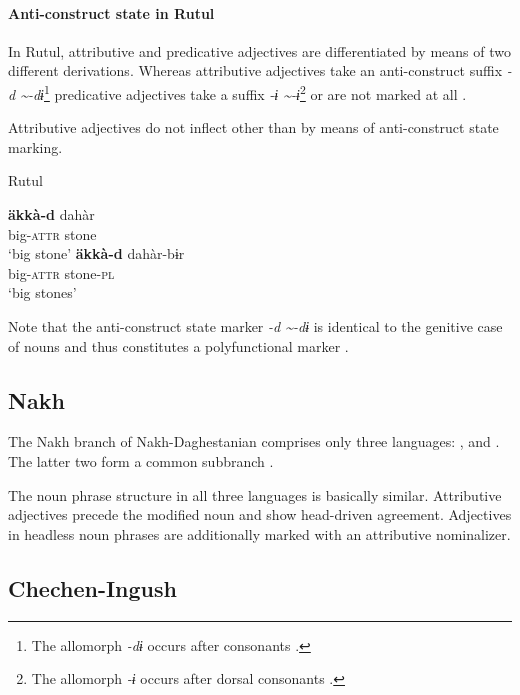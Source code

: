 \paragraph{Anti-construct state in Rutul}
In Rutul, attributive and predicative adjectives are differentiated by means of two different derivations. Whereas attributive adjectives take an anti-construct suffix \textit{-d \textasciitilde-dɨ}\footnote{The allomorph \textit{-dɨ} occurs after consonants \citep[224]{alekseev1994a}.} predicative adjectives take a suffix \textit{-ɨ \textasciitilde-ɨ}\footnote{The allomorph \textit{-ɨ} occurs after dorsal consonants \citep[224]{alekseev1994a}.} or are not marked at all \citep[224]{alekseev1994a}.

Attributive adjectives do not inflect other than by means of anti-construct state marking.
\begin{exe}
\ex \rm{Rutul \citep[237]{alekseev1994a}}
\begin{xlist}
\ex
\gll	\textbf{äkkà-d} dahàr\\
	big-\textsc{attr} stone\\
\glt	‘big stone’
\ex
\gll	\textbf{äkkà-d} dahàr-bɨr\\
	big-\textsc{attr} stone-\textsc{pl}\\
\glt	‘big stones’
\end{xlist}
\end{exe}
Note that the anti-construct state marker \textit{-d \textasciitilde-dɨ} is identical to the genitive case of nouns and thus constitutes a polyfunctional marker \cite{alekseev1994a}.

\subsection{Nakh}
The Nakh branch of Nakh-Daghestanian comprises only three languages: ,  and . The latter two form a common subbranch \citep[220, 233]{salminen2007}.

The noun phrase structure in all three languages is basically similar. Attributive adjectives precede the modified noun and show head-driven agreement. Adjectives in headless noun phrases are additionally marked with an attributive nominalizer.

\subsection{Chechen-Ingush}\label{ingush synchr}
